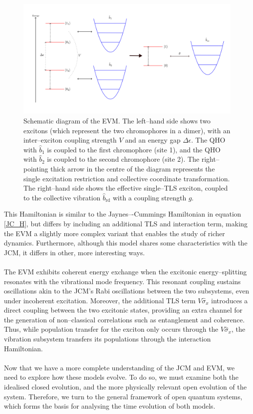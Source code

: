 \documentclass[11pt]{article}
\begin{document}
\begin{figure}[h]
    \centering
    \includegraphics[scale=0.7]{Images/EVM.png}
    \caption{Schematic diagram of the EVM. The left--hand side shows two excitons (which represent the two chromophores in a dimer), with an inter--exciton coupling strength $V$ and an energy gap $\Delta\epsilon$. The QHO with $\hat{b}_1$ is coupled to the first chromophore (site 1), and the QHO with $\hat{b}_2$ is coupled to the second chromophore (site 2). The right--pointing thick arrow in the centre of the diagram represents the single excitation restriction and collective coordinate transformation. The right--hand side shows the effective single--TLS exciton, coupled to the collective vibration $\hat{b}_{\scriptscriptstyle \text{rd}}$ with a coupling strength $g$.}
    \label{fig:img_EVM}
\end{figure}

\noindent This Hamiltonian is similar to the Jaynes–-Cummings Hamiltonian in equation \eqref{JC_H}, but differs by including an additional TLS and interaction term, making the EVM a slightly more complex variant that enables the study of richer dynamics. Furthermore, although this model shares some characteristics with the JCM, it differs in other, more interesting ways. \\
\\
The EVM exhibits coherent energy exchange when the excitonic energy--splitting resonates with the vibrational mode frequency. This resonant coupling sustains oscillations akin to the JCM's Rabi oscillations between the two subsystems, even under incoherent excitation. Moreover, the additional TLS term $V\hat{\sigma}_x$ introduces a direct coupling between the two excitonic states, providing an extra channel for the generation of non--classical correlations such as entanglement and coherence. Thus, while population transfer for the exciton only occurs through the $V\hat{\sigma}_x$, the vibration subsystem transfers its populations through the interaction Hamiltonian.\\
\\
Now that we have a more complete understanding of the JCM and EVM, we need to explore how these models evolve. To do so, we must examine both the idealised closed evolution, and the more physically relevant open evolution of the system. Therefore, we turn to the general framework of open quantum systems, which forms the basis for analysing the time evolution of both models.
\end{document}
